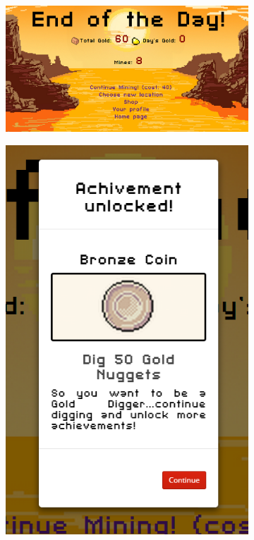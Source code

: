\documentclass{mproj}
\begin{document}
\begin{figure}[!h]
        \centering
        \begin{subfigure} [h] {0.6\textwidth}
                \centering
                \includegraphics [width=1\textwidth] {endofday.png}
        \end{subfigure}
        \space
        \space
        \begin{subfigure} [h] {0.2\textwidth}
                \centering
                \includegraphics [width=1\textwidth] {bronze.png}
        \end{subfigure}
\end{figure}
\end{document}
